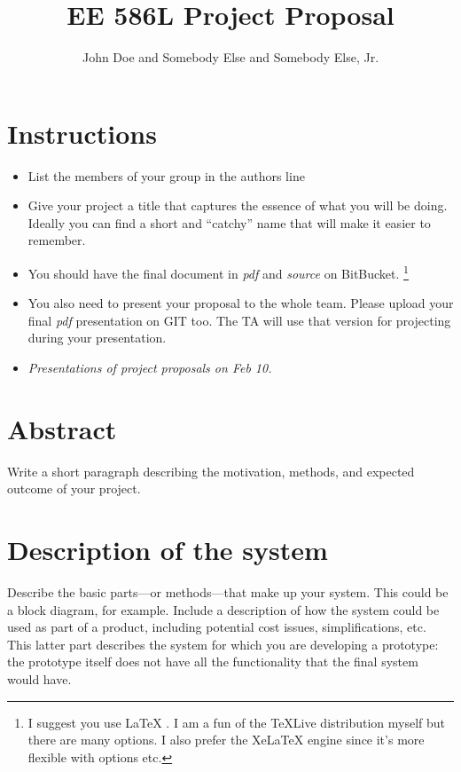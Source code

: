 \documentclass{article}
\title{EE 586L Project Proposal}
\author{John Doe and Somebody Else and Somebody Else, Jr. }
\begin{document}
\maketitle

\section*{Instructions}

\begin{itemize}
\item List the members of your group in the authors line 
\item Give your project a title that captures the essence of what you will be doing. Ideally you can find a short and “catchy” name that will make it easier to remember. 

\item You should have the final document in \emph{pdf} and \emph{source} on BitBucket. \footnote{I suggest you use LaTeX \cite{latexbeauty}. I am a fun of the TeXLive distribution myself \cite{texlive} but there are many options. I also prefer the XeLaTeX \cite{xetex} engine since it's more flexible with options etc.}

\item You also need to present your proposal to the whole team.  Please upload your final \emph{pdf} presentation on GIT too. The TA will use that  version for projecting during your presentation.

\item \emph{Presentations of project proposals on Feb 10.}

\end{itemize}

\section{Abstract}
Write a short paragraph describing the motivation, methods, and expected outcome of your project.

\section{Description of the system}
Describe the basic parts—or methods—that make up your system. This could be a block diagram, for example. Include a description of how the system could be used as part of a product, including potential cost issues, simplifications, etc. This latter part describes the system for which you are developing a prototype: the prototype itself does not have all the functionality that the final system would have. 
\end{document}
